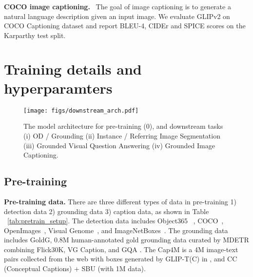 \documentclass{article}
\newcommand{\our}{GLIPv2\xspace}
\begin{document}
\textbf{COCO image captioning.}~\cite{chen2015microsoft} The goal of image captioning is to generate a natural language description given an input image. We evaluate \our on COCO Captioning dataset and report BLEU-4, CIDEr and SPICE scores on the Karparthy test split.

\section{Training details and hyperparamters}
\label{sec:recipes}

\begin{figure}[ht]
    \centering
    \texttt{[image: figs/downstream\_arch.pdf]}
    \caption{The model architecture for pre-training (0), and downstream tasks (i) OD / Grounding (ii) Instance / Referring Image Segmentation (iii) Grounded Visual Question Answering (iv) Grounded Image Captioning.}
    \label{fig:downstream_arch}
\end{figure}



\subsection{Pre-training} 
\textbf{Pre-training data.} There are three different types of data in pre-training 1) detection data 2) grounding data 3) caption data, as shown in Table ~\ref{tab:pretrain_setup}. The detection data includes Object365 ~\cite{shao2019objects365}, COCO~\cite{caesar2018coco}, OpenImages~\cite{krasin2017openimages}, Visual Genome~\cite{krishna2017visual}, and ImageNetBoxes~\cite{imagenet}. The grounding data includes GoldG, 0.8M human-annotated gold grounding data curated by MDETR \cite{kamath2021mdetr} combining Flick30K, VG Caption, and GQA \cite{hudson2019gqa}. The Cap4M is a 4M image-text pairs collected from the web with boxes generated by GLIP-T(C) in \cite{li2021grounded}, and CC (Conceptual Captions) + SBU (with 1M data). 

\begin{table}[ht!]
\caption{A detailed list of \our model variants}
\label{tab:pretrain_setup}
\end{table}
\end{document}
